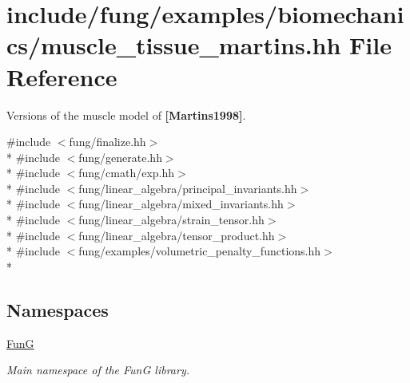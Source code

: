 \hypertarget{muscle__tissue__martins_8hh}{}\section{include/fung/examples/biomechanics/muscle\+\_\+tissue\+\_\+martins.hh File Reference}
\label{muscle__tissue__martins_8hh}


Versions of the muscle model of {\bfseries [Martins1998]}.  


{\ttfamily \#include $<$fung/finalize.\+hh$>$}\\*
{\ttfamily \#include $<$fung/generate.\+hh$>$}\\*
{\ttfamily \#include $<$fung/cmath/exp.\+hh$>$}\\*
{\ttfamily \#include $<$fung/linear\+\_\+algebra/principal\+\_\+invariants.\+hh$>$}\\*
{\ttfamily \#include $<$fung/linear\+\_\+algebra/mixed\+\_\+invariants.\+hh$>$}\\*
{\ttfamily \#include $<$fung/linear\+\_\+algebra/strain\+\_\+tensor.\+hh$>$}\\*
{\ttfamily \#include $<$fung/linear\+\_\+algebra/tensor\+\_\+product.\+hh$>$}\\*
{\ttfamily \#include $<$fung/examples/volumetric\+\_\+penalty\+\_\+functions.\+hh$>$}\\*
\subsection*{Namespaces}
\begin{DoxyCompactItemize}
\item 
 \hyperlink{namespaceFunG}{FunG}
\begin{DoxyCompactList}\small\item\em Main namespace of the FunG library. \end{DoxyCompactList}\end{DoxyCompactItemize}
